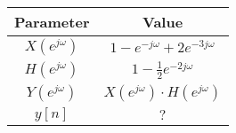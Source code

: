 
    \begin{tabular}{|c|c|}
       \hline
        \textbf{Parameter} & \textbf{Value}\\
        \hline
        $X(e^{j\omega})$ & $1 - e^{-j\omega} + 2e^{-3j\omega}$ \\
        \hline
        $H(e^{j\omega})$ & $1 - \frac{1}{2} e^{-2j\omega}$ \\
        \hline
        $Y(e^{j\omega})$ & $X(e^{j\omega}) \cdot H(e^{j\omega})$\\
        \hline
        $y[n]$           & $?$\\
        \hline
    \end{tabular}
    
